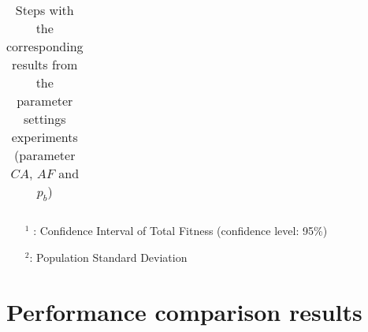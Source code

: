 \begin{table}
\begin{tabular}{|l|l|l|c||c|c|c|c|c|}
    \hline
    \end{tabular}
    \caption {Steps with the corresponding results from the parameter settings experiments (parameter $CA$, $AF$ and $p_b$)}
    \tiny
    \begin{itemize}[noitemsep]
    \item[$^1$ :] Confidence Interval of Total Fitness (confidence level: 95\%)
    \item[$^2$:] Population Standard Deviation 
    \end{itemize}
    \label{table:pm2}
\end{table}


\section{Performance comparison results}
\label{sec:performanceComparisonAppendix}


